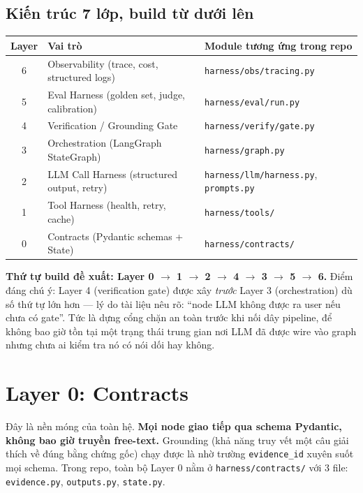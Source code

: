 \documentclass[12pt,a4paper]{article}
\newcommand{\file}[1]{\texttt{#1}}
\begin{document}
\subsection*{Kiến trúc 7 lớp, build từ dưới lên}

\begin{center}
\begin{tabular}{|c|l|l|}
\hline
\textbf{Layer} & \textbf{Vai trò} & \textbf{Module tương ứng trong repo} \\
\hline
6 & Observability (trace, cost, structured logs) & \file{harness/obs/tracing.py} \\
5 & Eval Harness (golden set, judge, calibration) & \file{harness/eval/run.py} \\
4 & Verification / Grounding Gate & \file{harness/verify/gate.py} \\
3 & Orchestration (LangGraph StateGraph) & \file{harness/graph.py} \\
2 & LLM Call Harness (structured output, retry) & \file{harness/llm/harness.py}, \file{prompts.py} \\
1 & Tool Harness (health, retry, cache) & \file{harness/tools/} \\
0 & Contracts (Pydantic schemas + State) & \file{harness/contracts/} \\
\hline
\end{tabular}
\end{center}

\textbf{Thứ tự build đề xuất: Layer 0 $\to$ 1 $\to$ 2 $\to$ 4 $\to$ 3 $\to$ 5 $\to$ 6.} Điểm đáng
chú ý: Layer 4 (verification gate) được xây \emph{trước} Layer 3 (orchestration) dù số thứ tự lớn
hơn --- lý do tài liệu nêu rõ: ``node LLM không được ra user nếu chưa có gate''. Tức là dựng cổng
chặn an toàn trước khi nối dây pipeline, để không bao giờ tồn tại một trạng thái trung gian nơi
LLM đã được wire vào graph nhưng chưa ai kiểm tra nó có nói dối hay không.

\section{Layer 0: Contracts}

Đây là nền móng của toàn hệ. \textbf{Mọi node giao tiếp qua schema Pydantic, không bao giờ truyền
free-text.} Grounding (khả năng truy vết một câu giải thích về đúng bằng chứng gốc) chạy được là
nhờ trường \texttt{evidence\_id} xuyên suốt mọi schema. Trong repo, toàn bộ Layer 0 nằm ở
\file{harness/contracts/} với 3 file: \file{evidence.py}, \file{outputs.py}, \file{state.py}.
\end{document}
